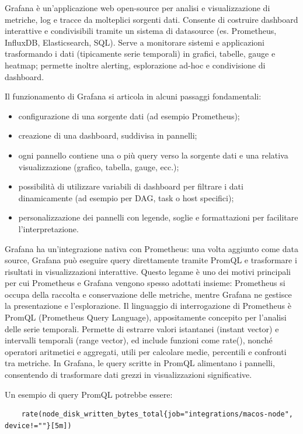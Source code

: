 Grafana è un’applicazione web open-source per analisi e visualizzazione di metriche, log e tracce da molteplici sorgenti dati. Consente di costruire dashboard interattive e condivisibili tramite un sistema di datasource (es. Prometheus, InfluxDB, Elasticsearch, SQL).
Serve a monitorare sistemi e applicazioni trasformando i dati (tipicamente serie temporali) in grafici, tabelle, gauge e heatmap; permette inoltre alerting, esplorazione ad-hoc e condivisione di dashboard.


Il funzionamento di Grafana si articola in alcuni passaggi fondamentali:

\begin{itemize}
    \item configurazione di una sorgente dati (ad esempio Prometheus);
    \item creazione di una dashboard, suddivisa in pannelli;
    \item ogni pannello contiene una o più query verso la sorgente dati e una relativa visualizzazione (grafico, tabella, gauge, ecc.);
    \item possibilità di utilizzare variabili di dashboard per filtrare i dati dinamicamente (ad esempio per DAG, task o host specifici);
    \item personalizzazione dei pannelli con legende, soglie e formattazioni per facilitare l’interpretazione.
\end{itemize}
Grafana ha un’integrazione nativa con Prometheus: una volta aggiunto come data source, Grafana può eseguire query direttamente tramite PromQL e trasformare i risultati in visualizzazioni interattive. Questo legame è uno dei motivi principali per cui Prometheus e Grafana vengono spesso adottati insieme: Prometheus si occupa della raccolta e conservazione delle metriche, mentre Grafana ne gestisce la presentazione e l’esplorazione.
Il linguaggio di interrogazione di Prometheus è PromQL (Prometheus Query Language), appositamente concepito per l’analisi delle serie temporali. Permette di estrarre valori istantanei (instant vector) e intervalli temporali (range vector), ed include funzioni come rate(), nonché operatori aritmetici e aggregati, utili per calcolare medie, percentili e confronti tra metriche. In Grafana, le query scritte in PromQL alimentano i pannelli, consentendo di trasformare dati grezzi in visualizzazioni significative.


Un esempio di query PromQL potrebbe essere:
\begin{verbatim}
    rate(node_disk_written_bytes_total{job="integrations/macos-node", device!=""}[5m])
\end{verbatim}


